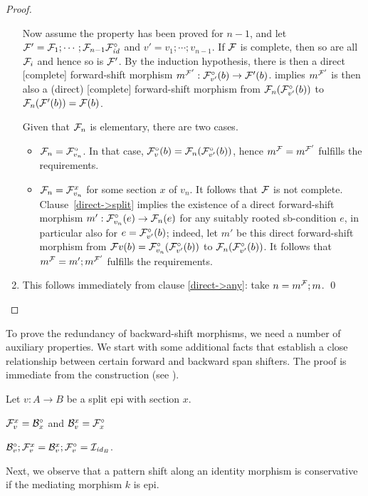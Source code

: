 \begin{proof}
\begin{enumerate}[topsep=\smallskipamount]
\smallskip Now assume the property has been proved for $n-1$, and let $\cF'=\cF_1;\cdots;\cF_{n-1}\dF\id$ and $v'=v_1;\cdots;v_{n-1}$. If $\cF$ is complete, then so are all $\cF_i$ and hence so is $\cF'$. By the induction hypothesis, there is then a direct [complete] forward-shift morphism $m^{\cF'}:\dF{v'}(b)\to \cF'(b)$.  implies $m^{\cF'}$ is then also a (direct) [complete] forward-shift morphism from $\cF_n(\dF{v'}(b))$ to $\cF_n(\cF'(b))=\cF(b)$.

\smallskip
Given that $\cF_n$ is elementary, there are two cases.
\begin{itemize}
\item $\cF_n=\dF{v_n}$. In that case, $\dF v(b)=\cF_n(\dF{v'}(b))$, hence $m^\cF=m^{\cF'}$ fulfills the requirements.
\item $\cF_n=\rF{v_n}x$ for some section $x$ of $v_n$. It follows that $\cF$ is not complete. Clause~\ref{direct->split} implies the existence of a direct forward-shift morphism $m':\dF{v_n}(e)\to \cF_n(e)$ for any suitably rooted sb-condition $e$, in particular also for $e=\dF{v'}(b)$; indeed, let $m'$ be this direct forward-shift morphism from $\cF v(b)=\dF{v_n}(\dF{v'}(b))$ to $\cF_n(\dF{v'}(b))$. It follows that $m^\cF=m';m^{\cF'}$ fulfills the requirements.  
\end{itemize}

\item This follows immediately from clause \ref{direct->any}: take $n=m^\cF;m$.
\qed
\end{enumerate}
\end{proof}
%
To prove the redundancy of backward-shift morphisms, we need a number of auxiliary properties. We start with some additional facts that establish a close relationship between certain forward and backward span shifters. The proof is immediate from the construction (see ).

\begin{lemma}
Let $v:A\to B$ be a split epi with section $x$.
\begin{enumerateS}
\item $\rF v x=\dB x$ and $\rB v x=\dF x$
\item $\dB v;\rF v x=\rB v x;\dF v=\cI_{\id_B}$.
\end{enumerateS}
\end{lemma}
%
Next, we observe that a pattern shift along an identity morphism is conservative if the mediating morphism $k$ is epi.

